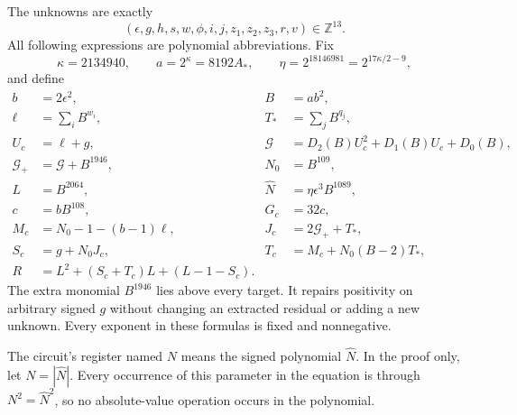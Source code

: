 The unknowns are exactly
\[
 (\epsilon,g,h,s,w,\phi,i,j,z_1,z_2,z_3,r,v)\in\mathbb Z^{13}.
\]
All following expressions are polynomial abbreviations. Fix
\[
 \kappa=2134940,\qquad a=2^\kappa=8192A_*,\qquad
 \eta=2^{18146981}=2^{17\kappa/2-9},
\]
and define
\begin{align*}
 b&=2\epsilon^2,& B&=ab^2,\\
 \ell&=\sum_iB^{w_i},& T_*&=\sum_jB^{q_j},\\
 U_c&=\ell+g,&\mathcal G&=D_2(B)U_c^2+D_1(B)U_c+D_0(B),\\
 \mathcal G_+&=\mathcal G+B^{1946},&N_0&=B^{109},\\
 L&=B^{2064},&\widehat N&=\eta\epsilon^3B^{1089},\\
 c&=bB^{108},&G_c&=32c,\\
 M_c&=N_0-1-(b-1)\ell,&J_c&=2\mathcal G_++T_*,\\
 S_c&=g+N_0J_c,&T_c&=M_c+N_0(B-2)T_*,\\
 R&=L^2+(S_c+T_c)L+(L-1-S_c).
\end{align*}
The extra monomial $B^{1946}$ lies above every target. It repairs positivity
on arbitrary signed $g$ without changing an extracted residual or adding a
new unknown. Every exponent in these formulas is fixed and nonnegative.

The circuit's register named $N$ means the signed polynomial $\widehat N$. In the proof only, let $N=|\widehat N|$. Every occurrence of this parameter in the equation is through $N^2=\widehat N^2$, so no absolute-value operation occurs in the polynomial.


